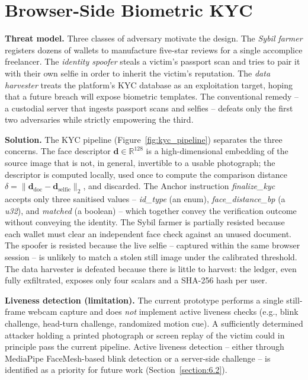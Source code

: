 \section{Browser-Side Biometric KYC}
\label{section:5.3}

\textbf{Threat model.} Three classes of adversary motivate the design. The \emph{Sybil farmer} registers dozens of wallets to manufacture five-star reviews for a single accomplice freelancer. The \emph{identity spoofer} steals a victim's passport scan and tries to pair it with their own selfie in order to inherit the victim's reputation. The \emph{data harvester} treats the platform's KYC database as an exploitation target, hoping that a future breach will expose biometric templates. The conventional remedy -- a custodial server that ingests passport scans and selfies -- defeats only the first two adversaries while strictly empowering the third.

\textbf{Solution.} The KYC pipeline (Figure~\ref{fig:kyc_pipeline}) separates the three concerns. The face descriptor $\mathbf{d} \in \mathbb{R}^{128}$ is a high-dimensional embedding of the source image that is not, in general, invertible to a usable photograph; the descriptor is computed locally, used once to compute the comparison distance $\delta = \|\mathbf{d}_{\text{doc}} - \mathbf{d}_{\text{selfie}}\|_2$, and discarded. The Anchor instruction \emph{finalize\_kyc} accepts only three sanitised values -- \emph{id\_type} (an enum), \emph{face\_distance\_bp} (a \emph{u32}), and \emph{matched} (a boolean) -- which together convey the verification outcome without conveying the identity. The Sybil farmer is partially resisted because each wallet must clear an independent face check against an unused document. The spoofer is resisted because the live selfie -- captured within the same browser session -- is unlikely to match a stolen still image under the calibrated threshold. The data harvester is defeated because there is little to harvest: the ledger, even fully exfiltrated, exposes only four scalars and a SHA-256 hash per user.

\textbf{Liveness detection (limitation).} The current prototype performs a single still-frame webcam capture and does \emph{not} implement active liveness checks (e.g., blink challenge, head-turn challenge, randomized motion cue). A sufficiently determined attacker holding a printed photograph or screen replay of the victim could in principle pass the current pipeline. Active liveness detection -- either through MediaPipe FaceMesh-based blink detection or a server-side challenge -- is identified as a priority for future work (Section~\ref{section:6.2}).

